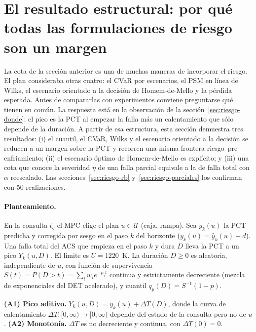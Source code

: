 \section{El resultado estructural: por qué todas las formulaciones de riesgo son un margen}\label{sec:prop-aditiva}
La cota de la sección anterior es una de muchas maneras de incorporar el riesgo. El plan
consideraba otras cuatro: el CVaR por escenarios, el PSM en línea de Wilks, el escenario
orientado a la decisión de Homem-de-Mello y la pérdida esperada. Antes de compararlas con
experimentos conviene preguntarse qué tienen en común. La respuesta está en la observación de
la sección~\ref{sec:riesgo-donde}: el pico es la PCT al empezar la falla más un calentamiento
que sólo depende de la duración. A partir de esa estructura, esta sección demuestra tres
resultados: (i) el cuantil, el CVaR, Wilks y el escenario orientado a la decisión se reducen a
un margen sobre la PCT y recorren una misma frontera riesgo--pre-enfriamiento; (ii) el escenario
óptimo de Homem-de-Mello es explícito; y (iii) una cota que conoce la severidad $\eta$ de una
falla parcial equivale a la de falla total con $\alpha$ reescalado. Las
secciones~\ref{sec:riesgo-rb} y~\ref{sec:riesgo-parciales} los confirman con 50
realizaciones.

\paragraph{Planteamiento.} En la consulta $t_q$ el MPC elige el plan $u\in\mathcal U$ (caja,
rampa). Sea $y_k(u)$ la PCT predicha y corregida por sesgo en el paso $k$ del horizonte
($y_k(u)=\hat y_k(u)+d$). Una falla total del ACS que empieza en el paso $k$ y dura $D$ lleva la
PCT a un pico $Y_k(u,D)$. El límite es $U=1220$~K. La duración $D\ge0$ es aleatoria, independiente
de $u$, con función de supervivencia $S(t)=P(D>t)=\sum_i w_i e^{-\mu_i t}$ continua y
estrictamente decreciente (mezcla de exponenciales del DET acelerado), y cuantil
$q_p(D)=S^{-1}(1-p)$.

\begin{definicion}\label{def:supuestos}
\textbf{(A1) Pico aditivo.} $Y_k(u,D)=y_k(u)+\Delta T(D)$, donde la curva de calentamiento
$\Delta T:[0,\infty)\to[0,\infty)$ depende del estado de la consulta pero no de $u$.
\textbf{(A2) Monotonía.} $\Delta T$ es no decreciente y continua, con $\Delta T(0)=0$.
\end{definicion}

